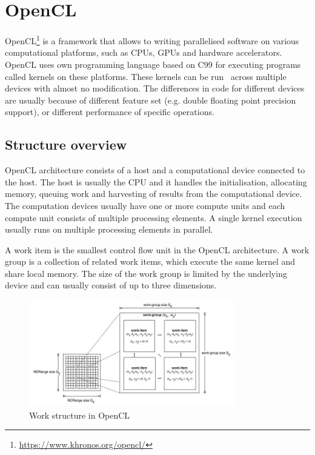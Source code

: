 \documentclass{l4proj}
\begin{document}
\section{OpenCL}

OpenCL\footnote{\url{https://www.khronos.org/opencl/}} is a framework that allows to writing parallelised software on various computational
platforms, such as CPUs, GPUs and hardware accelerators. OpenCL uses own programming language
based on C99 for executing programs called kernels on these platforms. These kernels can be run \
across multiple devices with almost no modification. The differences in code for different devices are 
usually because of different feature set (e.g. double floating point precision support), or
different performance of specific operations.

\subsection{Structure overview}

OpenCL architecture consists 
of a host and a computational device connected to the host.
The host is usually the CPU and it handles the initialisation, allocating memory, queuing work
and harvesting of results from the computational device. The computation devices usually have one
or more compute units and each compute unit consists of multiple processing elements. A single kernel
execution usually runs on multiple processing elements in parallel.

A work item is the smallest control flow unit in the OpenCL architecture. A work group is a 
collection of related work items, which execute the same kernel and share local memory.
The size of the work group is limited by the underlying device and can usually consist of up to 
three dimensions.

\begin{figure}
\centering
\includegraphics[width=0.8\textwidth]{images/opencl.jpg}
\caption{Work structure in OpenCL \protect\footnotemark}
\label{fig:opencl}
\end{figure}
\end{document}
